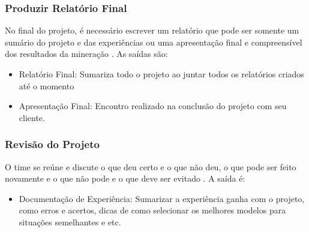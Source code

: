 \subsubsection{Produzir Relatório Final}
No final do projeto, é necessário escrever um relatório que pode ser somente um sumário do projeto e das experiências ou uma apresentação final e compreensível dos resultados da mineração \citep[29]{crispmanual}.
As saídas são:
\begin{itemize}
    \item Relatório Final: Sumariza todo o projeto ao juntar todos os relatórios criados até o momento \citep[88]{dmfd}
    \item Apresentação Final: Encontro realizado na conclusão do projeto com seu cliente.
\end{itemize}
\subsubsection{Revisão do Projeto}
O time se reúne e discute o que deu certo e o que não deu, o que pode ser feito novamente e o que não pode e o que deve ser evitado \citep[88]{dmfd}.
A saída é:
\begin{itemize}
    \item Documentação de Experiência: Sumarizar a experiência ganha com o projeto, como erros e acertos, dicas de como selecionar os melhores modelos para situações semelhantes e etc.
\end{itemize}